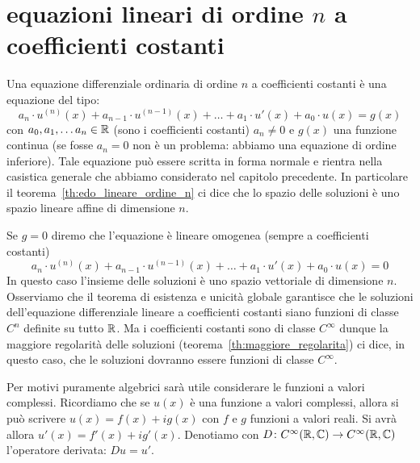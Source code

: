 \section{equazioni lineari di ordine $n$ a coefficienti costanti}

Una equazione differenziale ordinaria di ordine $n$ a coefficienti costanti è una equazione del tipo:
\mymark{***}
\begin{equation}\label{eq:edo_lineare_omogenea_coeff_costanti_non_omogenea}
  a_n\cdot u^{(n)}(x) + a_{n-1} \cdot u^{(n-1)}(x) + \dots + a_1 \cdot u'(x) + a_0 \cdot u(x) = g(x) 
\end{equation}
con $a_0, a_1, \dots a_n \in {\mathbb R}$ (sono i coefficienti costanti) $a_n\neq 0$ e $g(x)$ una funzione continua
(se fosse $a_n=0$ non è un problema: abbiamo una equazione di ordine inferiore).
Tale equazione può essere scritta in forma normale e rientra 
nella casistica generale che abbiamo considerato nel capitolo precedente.
In particolare 
il teorema~\ref{th:edo_lineare_ordine_n}
ci dice che lo spazio delle soluzioni è uno spazio lineare affine di dimensione $n$.

Se $g=0$ diremo che l'equazione è lineare omogenea (sempre a coefficienti costanti)
\begin{equation}\label{eq:edo_lineare_omogenea_coeff_costanti}
  a_n \cdot u^{(n)}(x) + a_{n-1} \cdot u^{(n-1)}(x) + \dots + a_1 \cdot u'(x) + a_0 \cdot u(x) = 0 
\end{equation}
In questo caso l'insieme delle soluzioni è uno spazio vettoriale di dimensione $n$.
Osserviamo che il teorema di esistenza e unicità globale garantisce che le soluzioni 
dell'equazione differenziale lineare a coefficienti costanti siano funzioni di 
classe $C^n$ definite su tutto ${\mathbb R}$. 
Ma i coefficienti costanti sono di classe $C^\infty$ dunque la maggiore regolarità delle soluzioni
(teorema~\ref{th:maggiore_regolarita}) 
ci dice, in questo caso, che le soluzioni dovranno essere funzioni di classe $C^\infty$.

Per motivi puramente algebrici sarà utile considerare le funzioni a valori complessi.
Ricordiamo che se $u(x)$ è una funzione a valori complessi,
allora si può scrivere $u(x) = f(x) + i g(x)$ con $f$ e $g$ funzioni a valori reali.
Si avrà allora $u'(x) = f'(x) + ig'(x)$.
Denotiamo con $D \colon C^\infty({\mathbb R}, {\mathbb C})\to C^\infty({\mathbb R}, {\mathbb C})$ l'operatore derivata: $D u = u'$.


